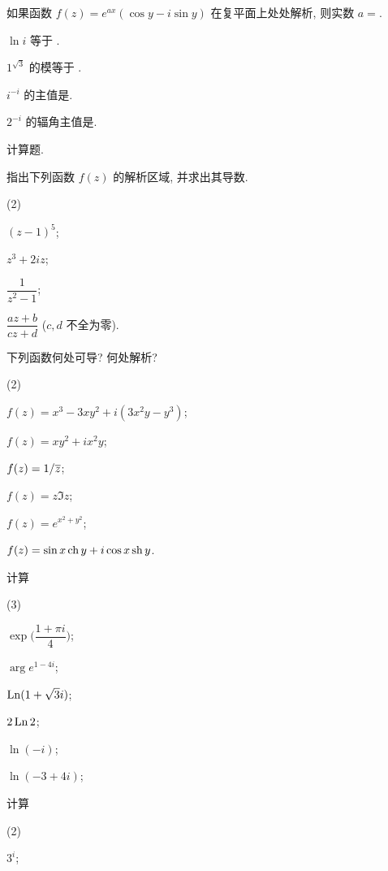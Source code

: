 \begin{homework}
\begin{subex}
    \item 如果函数 $f(z)=e^{ax}(\cos y-i\sin y)$ 在复平面上处处解析, 则实数 $a=$\fillblank{}.
    \item $\ln i$ 等于 \fillblank{}.
    \item $1^{\sqrt3}$ 的模等于 \fillblank{}.
    \item $i^{-i}$ 的主值是\fillblank{}.
    \item $2^{-i}$ 的辐角主值是\fillblank{}.
  \end{subex}
  \item 计算题.
  \begin{subex}
    \item 指出下列函数 $f(z)$ 的解析区域, 并求出其导数.
      \begin{subsubex}(2)
        \item $(z-1)^5$;
        \item $z^3+2iz$;
        \item $\dfrac1{z^2-1}$;
        \item $\dfrac{az+b}{cz+d}$ ($c,d$ 不全为零).
      \end{subsubex}
    \item 下列函数何处可导? 何处解析?
      \begin{subsubex}(2)
        \item $f(z)=x^3-3xy^2+i(3x^2y-y^3)$;
        \item $f(z)=xy^2+ix^2y$;
        \item $f(z)=1/\overline z$;
        \item $f(z)=z\Im z$;
        \item $f(z)=e^{x^2+y^2}$;
        \item $f(z)=\sin x\operatorname{ch} y+i\cos x\operatorname{sh} y$.
      \end{subsubex}
    \item 计算
      \begin{subsubex}(3)
        \item $\exp\bigl(\dfrac{1+\pi i}4\bigr)$;
        \item $\arg e^{1-4i}$;
        \item $\operatorname{Ln}(1+\sqrt3i)$;
        \item $2\operatorname{Ln}2$;
        \item $\ln(-i)$;
        \item $\ln(-3+4i)$;
      \end{subsubex}
    \item 计算
      \begin{subsubex}(2)
        \item $3^i$;

\end{subsubex}
\end{subex}
\end{homework}
